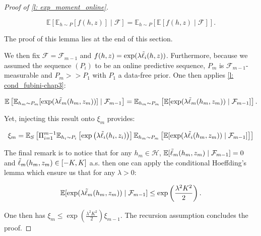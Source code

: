 \begin{proof}[Proof of \cref{l: exp_moment_online}]
\begin{lemma}
  \[ \mathbb{E}\left[\mathbb{E}_{h\sim P} [f(h,z)] \mid \mathcal{F} \right] =  \mathbb{E}_{h\sim P} \left[ \mathbb{E}[f(h,z)\mid \mathcal{F}] \right].    \]
\end{lemma}

\noindent The proof of this lemma lies at the end of this section.

\noindent We then fix $\mathcal{F}= \mathcal{F}_{m-1}$ and $f(h,z)= \exp(\lambda\Tilde{\ell}_i(h,z))$. Furthermore, because we assumed the sequence $(P_i)$ to be an online predictive sequence, $P_m$ is $\mathcal{F}_{m-1}$-measurable and $P_m>>P_1$ with $P_1$ a data-free prior. One then applies \cref{l: cond_fubini-chap3}:

\[ \mathbb{E}
\left[ \mathbb{E}_{h_m\sim P_m} [\exp(\lambda \Tilde{\ell}_m(h_m,z_m))] \mid \mathcal{F}_{m-1} \right] =  \mathbb{E}_{h_m\sim P_m} \left[ \mathbb{E}
[\exp(\lambda \Tilde{\ell}_m(h_m,z_m)) \mid \mathcal{F}_{m-1}] \right] . \]

\noindent Yet, injecting this result onto $\xi_m$ provides:

\begin{align*}
  \xi_m = \mathbb{E}_S\left[ \Pi_{i=1}^{m-1}\mathbb{E}_{h_i \sim P_i} \left[\exp\left(\lambda  \Tilde{\ell}_i(h_i,z_i)\right)\right] \mathbb{E}_{h_m\sim P_m} \left[ \mathbb{E}
  [\exp(\lambda \Tilde{\ell}_i(h_m,z_m)) \mid \mathcal{F}_{m-1}] \right] \right]
\end{align*}

The final remark is to notice that for any $h_m\in\mathcal{H}$, $\mathbb{E}[\Tilde{\ell}_m(h_m,z_m)\mid \mathcal{F}_{m-1}] = 0$ and $\Tilde{\ell}_m(h_m,z_m)\in [-K,K]$ a.s. then one can apply the conditional Hoeffding's lemma which ensure us that for any $\lambda>0$:

\[ \mathbb{E}
[\exp(\lambda \Tilde{\ell}_m(h_m,z_m)) \mid \mathcal{F}_{m-1}] \leq \exp\left( \frac{\lambda^2K^2}{2}   \right). \]

One then has $\xi_m \leq \exp\left( \frac{\lambda^2K^2}{2}   \right) \xi_{m-1}$. The recursion assumption concludes the proof.


\end{proof}



